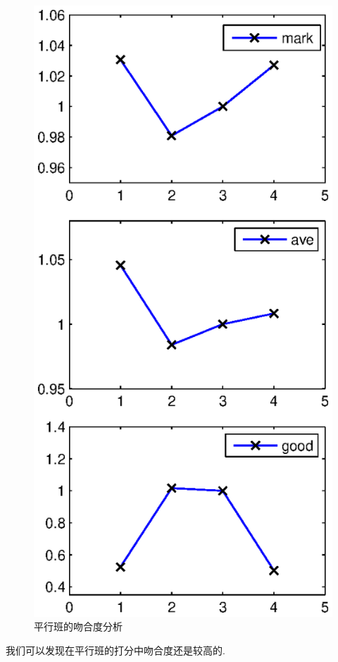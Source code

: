 \documentclass[a4paper]{article}
\begin{document}
  \begin{figure}[H]
  \centerline{\includegraphics[scale=0.5]{coincidenorm.eps}}
  \caption{平行班的吻合度分析}
  \end{figure}
  我们可以发现在平行班的打分中吻合度还是较高的.
 \clearpage
\end{document}

